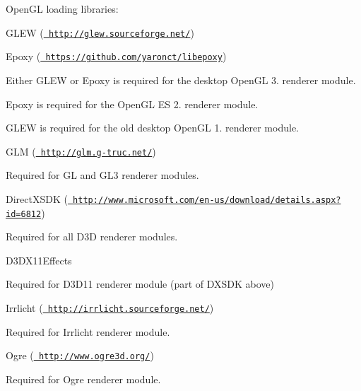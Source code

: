 \begin{DoxyItemize}
\item Open\+GL loading libraries\+:
\begin{DoxyItemize}
\item G\+L\+EW (\href{http://glew.sourceforge.net/}{\texttt{ http\+://glew.\+sourceforge.\+net/}})
\item Epoxy (\href{https://github.com/yaronct/libepoxy}{\texttt{ https\+://github.\+com/yaronct/libepoxy}})
\item Either G\+L\+EW or Epoxy is required for the desktop Open\+GL 3. renderer module.
\item Epoxy is required for the Open\+GL ES 2. renderer module.
\item G\+L\+EW is required for the old desktop Open\+GL 1. renderer module.
\end{DoxyItemize}
\item G\+LM (\href{http://glm.g-truc.net/}{\texttt{ http\+://glm.\+g-\/truc.\+net/}})
\begin{DoxyItemize}
\item Required for GL and G\+L3 renderer modules.
\end{DoxyItemize}
\item Direct\+X\+S\+DK (\href{http://www.microsoft.com/en-us/download/details.aspx?id=6812}{\texttt{ http\+://www.\+microsoft.\+com/en-\/us/download/details.\+aspx?id=6812}})
\begin{DoxyItemize}
\item Required for all D3D renderer modules.
\end{DoxyItemize}
\item D3\+D\+X11\+Effects
\begin{DoxyItemize}
\item Required for D3\+D11 renderer module (part of D\+X\+S\+DK above)
\end{DoxyItemize}
\item Irrlicht (\href{http://irrlicht.sourceforge.net/}{\texttt{ http\+://irrlicht.\+sourceforge.\+net/}})
\begin{DoxyItemize}
\item Required for Irrlicht renderer module.
\end{DoxyItemize}
\item Ogre (\href{http://www.ogre3d.org/}{\texttt{ http\+://www.\+ogre3d.\+org/}})
\begin{DoxyItemize}
\item Required for Ogre renderer module.
\end{DoxyItemize}

\end{DoxyItemize}
